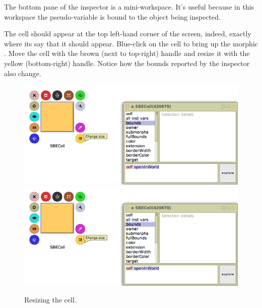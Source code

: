 \documentclass[a4paper,10pt,twoside]{book}
\begin{document}

The bottom pane of the inspector is a mini-workspace.  It's useful because in this workspace the pseudo-variable \self is bound to the object being inspected. 

The cell should appear at the top left-hand corner of the screen, indeed, exactly where its  say that it should appear.
Blue-click on the cell to bring up the morphic .
Move the cell with the brown (next to top-right) handle and resize it with the yellow (bottom-right) handle.
Notice how the bounds reported by the inspector also change.

\begin{figure}[htbp]
\centering
\ifluluelse
	{\includegraphics[width=\textwidth]{SBECellResize} }
	{\includegraphics[scale=0.7]{SBECellResize} }
\caption{Resizing the cell.\label{fig:cellresize}}
\end{figure}
\end{document}
